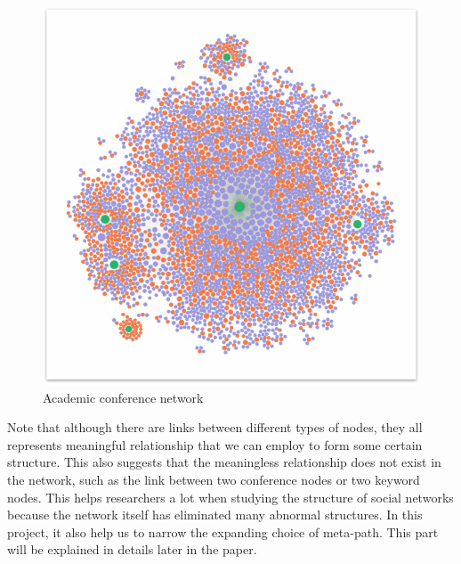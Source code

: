 \documentclass{acmtog} %
\begin{document}
\begin{figure}[H]
  \centering
  \includegraphics[width=0.7\linewidth]{an.png}
  \caption{Academic conference network}
  \label{1}
\end{figure}
Note that although there are links between different types of nodes, they all represents meaningful relationship that we can employ to form some certain structure. This also suggests that the meaningless relationship does not exist in the network, such as the link between two conference nodes or two keyword nodes. This helps researchers a lot when studying the structure of social networks because the network itself has eliminated many abnormal structures. In this project, it also help us to narrow the expanding choice of meta-path. This part will be explained in details later in the paper.
\end{document}
